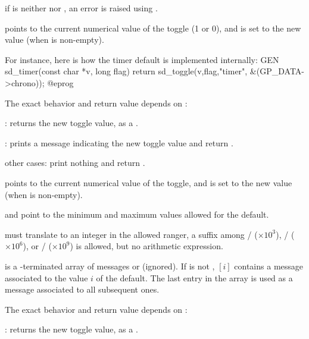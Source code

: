 \item if  is neither  nor , an error is raised using
.

\item {} points to the current numerical value of the toggle (1 or 0),
and is set to the new value (when  is non-empty).

For instance, here is how the timer default is implemented internally:
\bprog
GEN
sd_timer(const char *v, long flag)
{ return sd_toggle(v,flag,"timer", &(GP_DATA->chrono)); }
@eprog

The exact behavior and return value depends on :

\item {}: returns the new toggle value, as a .

\item {}: prints a message indicating the new toggle value
and return .

\item other cases: print nothing and return .



\item {} points to the current numerical value of the toggle, and is set
to the new value (when  is non-empty).

\item {} and  point to the minimum and maximum values allowed
for the default.

\item {} must translate to an integer in the allowed ranger, a suffix
among
/ ($\times 10^3$),
/ ($\times 10^6$),
or
/ ($\times 10^9$) is allowed, but no arithmetic expression.

\item {} is a \kbd[NULL]-terminated array of messages or 
(ignored). If  is not , $[i]$ contains
a message associated to the value $i$ of the default. The last entry in the
 array is used as a message associated to all subsequent ones.

The exact behavior and return value depends on :

\item {}: returns the new toggle value, as a .

